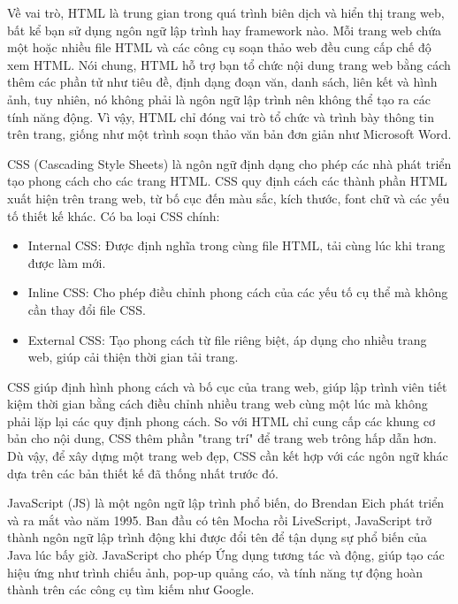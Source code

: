 \documentclass[a4paper]{report}
\begin{document}
\medskip

Về vai trò, HTML là trung gian trong quá trình biên dịch và hiển thị trang web, bất kể bạn sử dụng ngôn ngữ lập trình hay framework nào. Mỗi trang web chứa một hoặc nhiều file HTML và các công cụ soạn thảo web đều cung cấp chế độ xem HTML. Nói chung, HTML hỗ trợ bạn tổ chức nội dung trang web bằng cách thêm các phần tử như tiêu đề, định dạng đoạn văn, danh sách, liên kết và hình ảnh, tuy nhiên, nó không phải là ngôn ngữ lập trình nên không thể tạo ra các tính năng động. Vì vậy, HTML chỉ đóng vai trò tổ chức và trình bày thông tin trên trang, giống như một trình soạn thảo văn bản đơn giản như Microsoft Word.

\medskip

CSS (Cascading Style Sheets) là ngôn ngữ định dạng cho phép các nhà phát triển tạo phong cách cho các trang HTML. CSS quy định cách các thành phần HTML xuất hiện trên trang web, từ bố cục đến màu sắc, kích thước, font chữ và các yếu tố thiết kế khác. Có ba loại CSS chính:

\begin{itemize}
    \item Internal CSS: Được định nghĩa trong cùng file HTML, tải cùng lúc khi trang được làm mới.
    \item Inline CSS: Cho phép điều chỉnh phong cách của các yếu tố cụ thể mà không cần thay đổi file CSS.
    \item External CSS: Tạo phong cách từ file riêng biệt, áp dụng cho nhiều trang web, giúp cải thiện thời gian tải trang.
\end{itemize}

\medskip

CSS giúp định hình phong cách và bố cục của trang web, giúp lập trình viên tiết kiệm thời gian bằng cách điều chỉnh nhiều trang web cùng một lúc mà không phải lặp lại các quy định phong cách. So với HTML chỉ cung cấp các khung cơ bản cho nội dung, CSS thêm phần "trang trí" để trang web trông hấp dẫn hơn. Dù vậy, để xây dựng một trang web đẹp, CSS cần kết hợp với các ngôn ngữ khác dựa trên các bản thiết kế đã thống nhất trước đó.

\medskip

JavaScript (JS) là một ngôn ngữ lập trình phổ biến, do Brendan Eich phát triển và ra mắt vào năm 1995. Ban đầu có tên Mocha rồi LiveScript, JavaScript trở thành ngôn ngữ lập trình động khi được đổi tên để tận dụng sự phổ biến của Java lúc bấy giờ. JavaScript cho phép Ứng dụng tương tác và động, giúp tạo các hiệu ứng như trình chiếu ảnh, pop-up quảng cáo, và tính năng tự động hoàn thành trên các công cụ tìm kiếm như Google.
\end{document}
